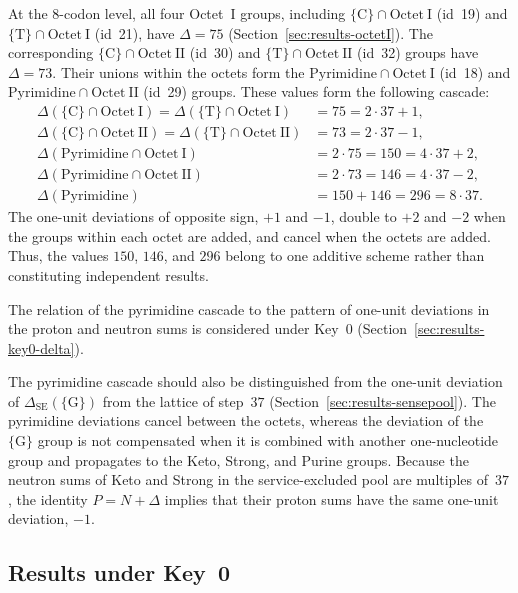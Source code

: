 \documentclass[11pt,a4paper]{article}
\renewcommand{\_}{\origunderscore\allowbreak}
\begin{document}
At the $8$-codon level, all four Octet~I groups, including
$\{\mathrm{C}\} \cap \mathrm{Octet~I}$ (id~19) and
$\{\mathrm{T}\} \cap \mathrm{Octet~I}$ (id~21), have
$\Delta = 75$ (Section~\ref{sec:results-octetI}). The corresponding
$\{\mathrm{C}\} \cap \mathrm{Octet~II}$ (id~30) and
$\{\mathrm{T}\} \cap \mathrm{Octet~II}$ (id~32) groups have
$\Delta = 73$. Their unions within the octets form the
$\mathrm{Pyrimidine} \cap \mathrm{Octet~I}$ (id~18) and
$\mathrm{Pyrimidine} \cap \mathrm{Octet~II}$ (id~29) groups. These
values form the following cascade:
\[
\begin{aligned}
\Delta(\{\mathrm{C}\} \cap \mathrm{Octet~I})
  = \Delta(\{\mathrm{T}\} \cap \mathrm{Octet~I})
  &= 75 = 2 \cdot 37 + 1, \\
\Delta(\{\mathrm{C}\} \cap \mathrm{Octet~II})
  = \Delta(\{\mathrm{T}\} \cap \mathrm{Octet~II})
  &= 73 = 2 \cdot 37 - 1, \\
\Delta(\mathrm{Pyrimidine} \cap \mathrm{Octet~I})
  &= 2 \cdot 75 = 150 = 4 \cdot 37 + 2, \\
\Delta(\mathrm{Pyrimidine} \cap \mathrm{Octet~II})
  &= 2 \cdot 73 = 146 = 4 \cdot 37 - 2, \\
\Delta(\mathrm{Pyrimidine})
  &= 150 + 146 = 296 = 8 \cdot 37.
\end{aligned}
\]
The one-unit deviations of opposite sign, $+1$ and $-1$, double to
$+2$ and $-2$ when the groups within each octet are added, and cancel
when the octets are added. Thus, the values $150$, $146$, and $296$
belong to one additive scheme rather than constituting independent
results.

The relation of the pyrimidine cascade to the pattern of one-unit
deviations in the proton and neutron sums is considered under Key~0
(Section~\ref{sec:results-key0-delta}).

The pyrimidine cascade should also be distinguished from the one-unit
deviation of $\Delta_{\mathrm{SE}}(\{\mathrm{G}\})$ from the lattice
of step~$37$ (Section~\ref{sec:results-sensepool}). The pyrimidine
deviations cancel between the octets, whereas the deviation of the
$\{\mathrm{G}\}$ group is not compensated when it is combined with
another one-nucleotide group and propagates to the Keto, Strong, and
Purine groups. Because the neutron sums of Keto and Strong in the
service-excluded pool are multiples of~$37$, the identity
$P=N+\Delta$ implies that their proton sums have the same one-unit
deviation, $-1$.

\subsection{Results under Key~0}
\label{sec:results-key0}
\end{document}
